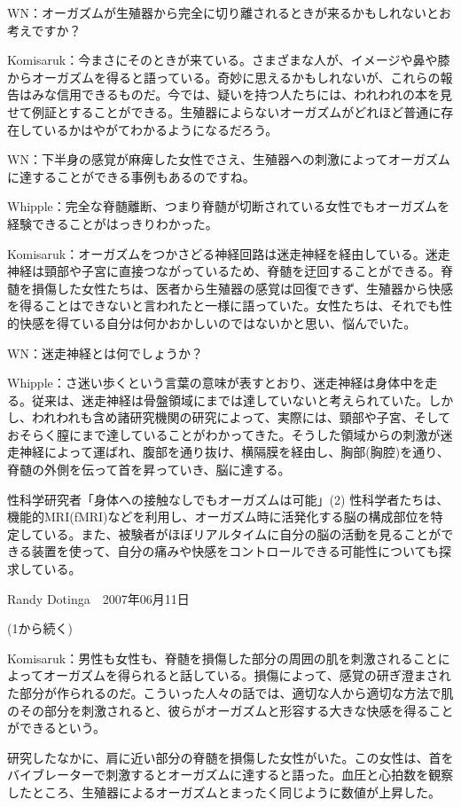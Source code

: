 WN：オーガズムが生殖器から完全に切り離されるときが来るかもしれないとお考えですか？

Komisaruk：今まさにそのときが来ている。さまざまな人が、イメージや鼻や膝からオーガズムを得ると語っている。奇妙に思えるかもしれないが、これらの報告はみな信用できるものだ。今では、疑いを持つ人たちには、われわれの本を見せて例証とすることができる。生殖器によらないオーガズムがどれほど普通に存在しているかはやがてわかるようになるだろう。

WN：下半身の感覚が麻痺した女性でさえ、生殖器への刺激によってオーガズムに達することができる事例もあるのですね。

Whipple：完全な脊髄離断、つまり脊髄が切断されている女性でもオーガズムを経験できることがはっきりわかった。

Komisaruk：オーガズムをつかさどる神経回路は迷走神経を経由している。迷走神経は頸部や子宮に直接つながっているため、脊髄を迂回することができる。脊髄を損傷した女性たちは、医者から生殖器の感覚は回復できず、生殖器から快感を得ることはできないと言われたと一様に語っていた。女性たちは、それでも性的快感を得ている自分は何かおかしいのではないかと思い、悩んでいた。

WN：迷走神経とは何でしょうか？

Whipple：さ迷い歩くという言葉の意味が表すとおり、迷走神経は身体中を走る。従来は、迷走神経は骨盤領域にまでは達していないと考えられていた。しかし、われわれも含め諸研究機関の研究によって、実際には、頸部や子宮、そしておそらく膣にまで達していることがわかってきた。そうした領域からの刺激が迷走神経によって運ばれ、腹部を通り抜け、横隔膜を経由し、胸部(胸腔)を通り、脊髄の外側を伝って首を昇っていき、脳に達する。




性科学研究者「身体への接触なしでもオーガズムは可能」(2)
性科学者たちは、機能的MRI(fMRI)などを利用し、オーガズム時に活発化する脳の構成部位を特定している。また、被験者がほぼリアルタイムに自分の脳の活動を見ることができる装置を使って、自分の痛みや快感をコントロールできる可能性についても探求している。

Randy Dotinga　2007年06月11日

(1から続く)

Komisaruk：男性も女性も、脊髄を損傷した部分の周囲の肌を刺激されることによってオーガズムを得られると話している。損傷によって、感覚の研ぎ澄まされた部分が作られるのだ。こういった人々の話では、適切な人から適切な方法で肌のその部分を刺激されると、彼らがオーガズムと形容する大きな快感を得ることができるという。

研究したなかに、肩に近い部分の脊髄を損傷した女性がいた。この女性は、首をバイブレーターで刺激するとオーガズムに達すると語った。血圧と心拍数を観察したところ、生殖器によるオーガズムとまったく同じように数値が上昇した。

